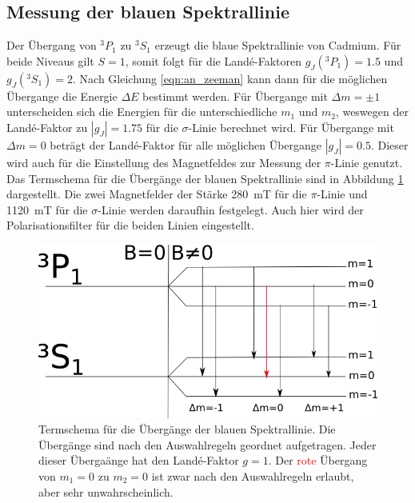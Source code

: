 \subsection{Messung der blauen Spektrallinie}
Der Übergang von $^3P_1$ zu $^3S_1$ erzeugt die blaue Spektrallinie von Cadmium.
Für beide Niveaus gilt $S=1$, somit folgt für die Landé-Faktoren $g_J(^3P_1) = \num{1.5}$ und $g_J(^3S_1) = \num{2}$.
Nach Gleichung \ref{eqn:an_zeeman} kann dann für die möglichen Übergange die Energie $\Delta E$ bestimmt werden.
Für Übergange mit $\Delta m = \pm 1$ unterscheiden sich die Energien für die unterschiedliche $m_1$ und $m_2$, weswegen der Landé-Faktor zu $|g_J| = \num{1.75}$ für die $\sigma$-Linie berechnet wird.
Für Übergange mit $\Delta m = 0$ beträgt der Landé-Faktor für alle möglichen Übergange $|g_J| = \num{0.5}$.
Dieser wird auch für die Einstellung des Magnetfeldes zur Messung der $\pi$-Linie genutzt.
Das Termschema für die Übergänge der blauen Spektrallinie sind in Abbildung \ref{fig:Term_blau} dargestellt.
Die zwei Magnetfelder der Stärke \SI{280}{\milli\tesla} für die $\pi$-Linie und \SI{1120}{\milli\tesla} für die $\sigma$-Linie werden daraufhin festgelegt.
Auch hier wird der Polarisationsfilter für die beiden Linien eingestellt.
\\
\begin{figure}[H]
  \centering
  \includegraphics[width = .6\textwidth]{images/Term_blau.png}
  \caption{Termschema für die Übergänge der blauen Spektrallinie. Die Übergänge sind nach den Auswahlregeln geordnet aufgetragen. Jeder dieser Übergaänge hat den Landé-Faktor $g=1$. Der \textcolor{red}{rote} Übergang von $m_1 = 0$ zu $m_2=0$ ist zwar nach den Auswahlregeln erlaubt, aber sehr unwahrscheinlich.}
  \label{fig:Term_blau}
\end{figure}
